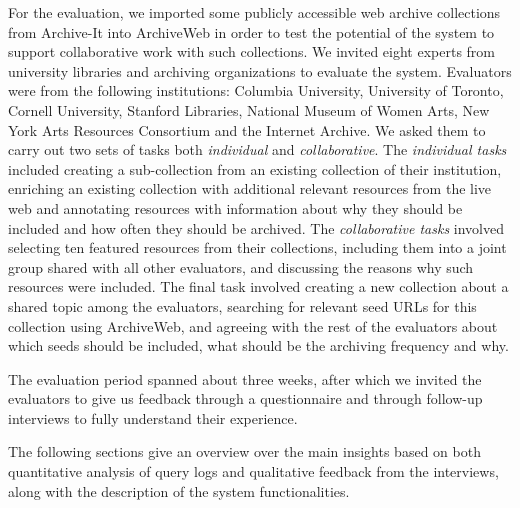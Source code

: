 \documentclass{llncs}
\begin{document}
For the evaluation, we imported some publicly
accessible web archive collections from Archive-It into ArchiveWeb in order to
test the potential of the system to support collaborative work
with such collections. We invited eight experts from university
libraries and archiving organizations
to evaluate the system. Evaluators were from the following
institutions: Columbia University, University of Toronto, Cornell
University, Stanford Libraries, National Museum of Women Arts, New
York Arts Resources Consortium and the Internet Archive. We asked them to
carry out two sets of tasks both \textit{individual} and
\textit{collaborative}. The \textit{individual tasks} included
creating a sub-collection from an existing collection of their
institution, enriching an existing collection with additional relevant
resources from the live web and annotating resources with information
about why they should be included and how often they should be
archived. The \textit{collaborative tasks} involved selecting ten
featured resources from their collections, including them into a joint
group shared with all other evaluators, and discussing the reasons why such resources were
included. The final task involved creating a new collection about a
shared topic among the evaluators, searching for relevant seed URLs
for this collection using ArchiveWeb, and agreeing with the rest of the
evaluators about which seeds should be included, what should be the
archiving frequency and why.

The evaluation period spanned about three weeks, after which we
invited the evaluators to give us feedback through a questionnaire and
through follow-up interviews to fully understand their experience.  

The following sections give an
overview over the main insights based on both quantitative analysis of
query logs and qualitative feedback from the interviews, along with
the description of the system functionalities.
\end{document}

